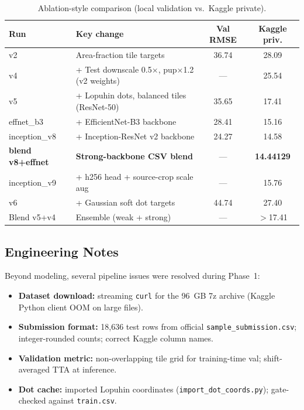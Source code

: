 \documentclass[12pt, a4paper]{article}
\begin{document}
\begin{table}[htbp]
\centering
\caption{Ablation-style comparison (local validation vs.\ Kaggle private).}
\label{tab:results}
\begin{tabular}{@{}p{2.4cm}p{3.6cm}cc@{}}
\toprule
\textbf{Run} & \textbf{Key change} & \textbf{Val RMSE} & \textbf{Kaggle priv.} \\ \midrule
v2 & Area-fraction tile targets & 36.74 & 28.09 \\
v4 & + Test downscale 0.5$\times$, pup$\times$1.2 (v2 weights) & --- & 25.54 \\
v5 & + Lopuhin dots, balanced tiles (ResNet-50) & 35.65 & 17.41 \\
effnet\_b3 & + EfficientNet-B3 backbone & 28.41 & 15.16 \\
inception\_v8 & + Inception-ResNet v2 backbone & 24.27 & 14.58 \\
\textbf{blend v8+effnet} & \textbf{Strong-backbone CSV blend} & --- & \textbf{14.44129} \\
inception\_v9 & + h256 head + source-crop scale aug & --- & 15.76 \\
v6 & + Gaussian soft dot targets & 44.74 & 27.40 \\
Blend v5+v4 & Ensemble (weak + strong) & --- & $>$17.41 \\ \bottomrule
\end{tabular}
\end{table}

\subsection{Engineering Notes}
Beyond modeling, several pipeline issues were resolved during Phase~1:
\begin{itemize}
    \item \textbf{Dataset download:} streaming \texttt{curl} for the 96~GB 7z archive (Kaggle Python client OOM on large files).
    \item \textbf{Submission format:} 18{,}636 test rows from official \texttt{sample\_submission.csv}; integer-rounded counts; correct Kaggle column names.
    \item \textbf{Validation metric:} non-overlapping tile grid for training-time val; shift-averaged TTA at inference.
    \item \textbf{Dot cache:} imported Lopuhin coordinates (\texttt{import\_dot\_coords.py}); gate-checked against \texttt{train.csv}.
\end{itemize}
\end{document}
